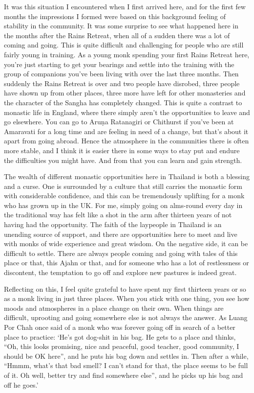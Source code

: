 It was this situation I encountered when I first arrived here, and for
the first few months the impressions I formed were based on this
background feeling of stability in the community. It was some surprise
to see what happened here in the months after the Rains Retreat, when
all of a sudden there was a lot of coming and going. This is quite
difficult and challenging for people who are still fairly young in
training. As a young monk spending your first Rains Retreat here, you're
just starting to get your bearings and settle into the training with the
group of companions you've been living with over the last three months. 
Then suddenly the Rains Retreat is over and two people have disrobed, 
three people have shown up from other places, three more have left for
other monasteries and the character of the Sangha has completely
changed. This is quite a contrast to monastic life in England, where
there simply aren't the opportunities to leave and go elsewhere. You can
go to Aruṇa Ratanagiri or Chithurst if you've been at Amaravati for a
long time and are feeling in need of a change, but that's about it apart
from going abroad. Hence the atmosphere in the communities there is
often more stable, and I think it is easier there in some ways to stay
put and endure the difficulties you might have. And from that you can
learn and gain strength. 

The wealth of different monastic opportunities here in Thailand is both
a blessing and a curse. One is surrounded by a culture that still
carries the monastic form with considerable confidence, and this can be
tremendously uplifting for a monk who has grown up in the UK. For me, 
simply going on alms-round every day in the traditional way has felt like
a shot in the arm after thirteen years of not having had the
opportunity. The faith of the laypeople in Thailand is an unending
source of support, and there are opportunities here to meet and live
with monks of wide experience and great wisdom. On the negative side, it
can be difficult to settle. There are always people coming and going
with tales of this place or that, this Ajahn or that, and for someone
who has a lot of restlessness or discontent, the temptation to go off
and explore new pastures is indeed great. 

Reflecting on this, I feel quite grateful to have spent my first
thirteen years or so as a monk living in just three places. When you
stick with one thing, you see how moods and atmospheres in a place
change on their own. When things are difficult, uprooting and going
somewhere else is not always the answer. As Luang Por Chah once said of
a monk who was forever going off in search of a better place to
practice: `He's got dog-shit in his bag. He gets to a place and thinks, 
``Oh, this looks promising, nice and peaceful, good teacher, good
community, I should be OK here'', and he puts his bag down and settles
in. Then after a while, ``Hmmm, what's that bad smell? I can't stand for
that, the place seems to be full of it. Oh well, better try and find
somewhere else'', and he picks up his bag and off he goes.'

